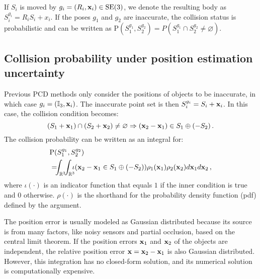 \documentclass[conference]{IEEEtran}
\newcommand{\SE}{\text{SE}}
\newcommand{\IR}{\mathbb{R}}
\newcommand{\xx}{{\bf x}}
\newcommand{\PP}{\text{P}}
\begin{document}
If $S_i$ is moved by $g_i=(R_i, \xx_i) \in \SE(3)$, we denote the resulting body as $S_i^{g_i}=R_iS_i+x_i$. If the poses $g_1$ and $g_2$ are inaccurate, the collision status is probabilistic and can be written as $\PP(S_1^{g_1}, S_2^{g_2}) = P(S_1^{g_1} \cap S_2^{g_2} \neq \varnothing)$. 

\subsection{Collision probability under position estimation uncertainty}

Previous PCD methods only consider the positions of objects to be inaccurate, in 
which case $g_i=(\mathbb{I}_3, \xx_i)$. The inaccurate point set is then $S_i^{g_i} = S_i + \xx_i$. In this case, the collision condition becomes:
\begin{equation*}
\left(S_1 + \xx_1\right) \cap \left( S_2 + \xx_2 \right) \neq \varnothing \Rightarrow (\xx_2 - \xx_1) \in S_1 \oplus (-S_2) \, .
\end{equation*}
The collision probability can be written as an integral for:
\begin{equation}
\begin{aligned}
\label{eq:pre:pcd-position}
&\PP(S_1^{g_1}, S_2^{g_2}) \\
&= \hskip -0.07in \int_{\IR^3} \hskip -0.05in \int_{\IR^3} \hskip -0.08in \iota(\xx_2-\xx_1 \in S_1\oplus(-S_2)) \rho_1(\xx_1)\rho_2(\xx_2)d\xx_1d\xx_2 \, ,
\end{aligned}
\end{equation}
where $\iota(\cdot)$ is an indicator function that equals $1$ if the inner condition is true and $0$ otherwise. $\rho(\cdot)$ is the shorthand for the probability density function (pdf) defined by the argument. 

The position error is usually modeled as Gaussian distributed because its source is from many factors, like noisy sensors and partial occlusion, based on the central limit theorem. If the position errors $\xx_1$ and $\xx_2$ of the objects are independent, the relative position error $\xx=\xx_2-\xx_1$ is also Gaussian distributed. However, this integration has no closed-form solution, and its numerical solution is computationally expensive. 
\end{document}
